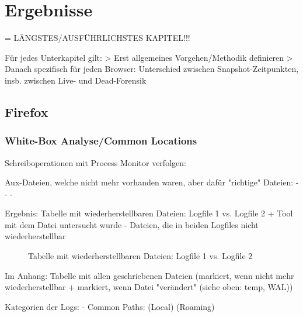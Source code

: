 \chapter{Ergebnisse}

= LÄNGSTES/AUSFÜHRLICHSTES KAPITEL!!!

Für jedes Unterkapitel gilt: 
> Erst allgemeines Vorgehen/Methodik definieren
> Danach spezifisch für jeden Browser: Unterschied zwischen Snapshot-Zeitpunkten, insb. zwischen Live- und Dead-Forensik

\section{Firefox}

\subsection*{White-Box Analyse/Common Locations}

Schreiboperationen mit Process Monitor verfolgen:

Aux-Dateien, welche nicht mehr vorhanden waren, aber dafür "richtige" Dateien:
	- %
	- %
	- %

Ergebnis: Tabelle mit wiederherstellbaren Dateien: Logfile 1 vs. Logfile 2 + Tool mit dem Datei untersucht wurde
- Dateien, die in beiden Logfiles nicht wiederherstellbar 
\begin{figure}[h!]
	\caption{Tabelle mit wiederherstellbaren Dateien: Logfile 1 vs. Logfile 2}
\end{figure}

Im Anhang: Tabelle mit allen geschriebenen Dateien (markiert, wenn nicht mehr wiederherstellbar + markiert, wenn Datei "verändert" (siehe oben: temp, WAL))

Kategorien der Logs:
- Common Paths:
	(Local) %
	(Roaming) %

